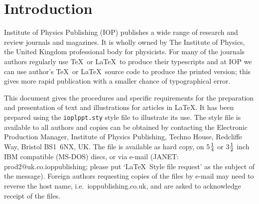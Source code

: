 \author{A J Cox\dag, Mark Telford\ddag\ and Al Troyano\ddag{}}

\address{\dag\ Electronic Production Manager, Institute of Physics
Publishing, Techno
House, Redcliffe Way, Bristol BS1 6NX, UK}

\address{\ddag\ Production Department, Institute of Physics Publishing,
Techno House,
Redcliffe Way, Bristol BS1 6NX, UK}


\begin{abstract}
This document describes the  preparation of an article in \LaTeX\ using
\verb"ioplppt.sty" (the IOP \LaTeX\ preprint style file)
for any of the journals published by Institute of Physics
Publishing.  This style file is designed to help
the author by simplifying the production of an article in a form that
can be refereed and copy edited and that can subsequently be swiftly
converted into the normal IOP journal styles by changing the
style file.
Authors submitting to both the single-column B5 and
double-column A4 format journals
should follow the guidelines set out here.
The source code will be converted to
the appropriate journal format at Institute of Physics Publishing.
For the printed version, Times fonts (and Helvetica in double-column
journals) will be used instead of Computer Modern.
\end{abstract}

%
%

\section{Introduction}
Institute of Physics Publishing
(IOP) publishes a wide range of research and review
journals and magazines. It is wholly owned by The Institute of Physics,
the United Kingdom professional body for physicists.
For many of the journals authors regularly use \TeX\ or \LaTeX\ to
produce their typescripts
and at IOP we can use author's \TeX\ or \LaTeX\ source code
to produce the printed version;  this gives
more rapid publication with a smaller chance of typographical
error.

This document gives the procedures and specific requirements for
the preparation and presentation of text and illustrations for
articles in \LaTeX\null. It has been prepared using the
\verb"ioplppt.sty" style file to illustrate its use. The
style file is available to all authors and copies can be
obtained by contacting the Electronic Production Manager,
Institute of Physics
Publishing, Techno House, Redcliffe Way, Bristol BS1~6NX, UK. The file
is available as hard copy, on 5$1\over 4$ or 3$1\over 2$ inch IBM
compatible (MS-DOS) discs,  or via e-mail (JANET:
prod2@uk.co.ioppublishing;
please put `\LaTeX\ Style file request' as the subject of the message).
Foreign authors requesting copies
of the files by e-mail may need to reverse the host name, i.e.\
ioppublishing.co.uk, and are asked to acknowledge receipt of the files.

